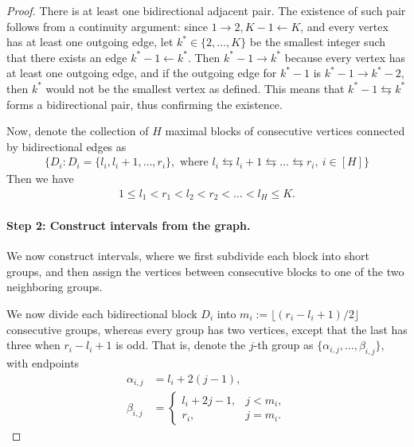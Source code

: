 \documentclass[11pt]{article}
\theoremstyle{statplain}
\theoremstyle{statdefinition}
\newcommand{\ra}{\rightarrow}
\newcommand{\la}{\leftarrow}
\newcommand{\0}{\mathbf{0}}
\newcommand{\discreteNum}{K} %
\begin{document}
\begin{proof}
There is at least one bidirectional adjacent pair. The existence of such pair follows from a continuity argument: since 
$1 \ra 2, \discreteNum-1 \la \discreteNum$, and every vertex has at least one outgoing edge, let $k^*\in \{2,\dots,\discreteNum\}$ be the smallest integer such that there exists an edge $k^* -1 \la k^*$. Then $k^* -1 \ra k^*$ because every vertex has at least one outgoing edge, and if the outgoing edge for $k^*-1$ is $k^*-1 \rightarrow k^*-2$, then  $k^*$ would not be the smallest vertex as defined. This means that $k^* - 1 \leftrightarrows k^*$ forms a bidirectional pair, thus confirming the existence.

Now, denote the collection of $H$ maximal blocks of consecutive vertices connected by bidirectional edges as
\begin{align*}
    \{D_i: D_i = \{l_i, l_i+1, \dots, r_i\} , \text{ where }l_i\leftrightarrows l_i+ 1\leftrightarrows\ldots\leftrightarrows r_i, ~i\in[H] \}
\end{align*}
Then we have 
\begin{align*}
    1\le l_1 < r_1 < l_2 < r_2 < \ldots < l_H \le \discreteNum.
\end{align*}

\paragraph{Step 2: Construct intervals from the graph.}
We now construct intervals, where we first subdivide each block into short groups, and then assign the vertices between consecutive blocks to one of the two neighboring groups.

We now divide each bidirectional block $D_i$ into $m_i:=\lfloor(r_i- l_i+1)/2\rfloor$ consecutive groups, whereas every group has two vertices, except that the last has three when
$r_i- l_i+1$ is odd. 
That is, denote the $j$-th group as
$\{\alpha_{i,j},\dots,\beta_{i,j}\}$, with endpoints
\begin{align}\label{eq:block-core-endpoints}
 \alpha_{i,j}&= l_i+2(j-1),\nonumber\\
 \beta_{i,j}&=
 \begin{cases}
   l_i+2j-1,&j<m_i,\\
  r_i,&j=m_i.
 \end{cases}
\end{align}


\end{proof}
\end{document}
